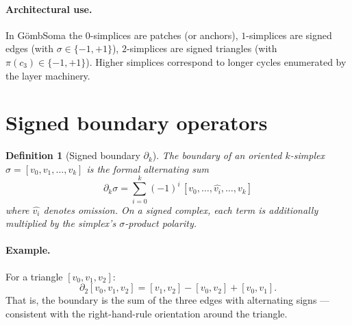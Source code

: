 \documentclass[11pt,a4paper]{article}
\newtheorem{definition}[theorem]{Definition}
\newcommand{\sig}{\ensuremath{\sigma}}
\begin{document}
\paragraph{Architectural use.} In G\"ombSoma the $0$-simplices are
patches (or anchors), $1$-simplices are signed edges (with $\sig \in
\{-1, +1\}$), $2$-simplices are signed triangles (with
$\pi(c_3) \in \{-1, +1\}$). Higher simplices correspond to longer
cycles enumerated by the layer machinery.

\section{Signed boundary operators}

\begin{definition}[Signed boundary $\partial_k$]
The boundary of an oriented $k$-simplex
$\sigma = [v_0, v_1, \ldots, v_k]$ is the formal alternating sum
\[
\partial_k \sigma = \sum_{i = 0}^{k} (-1)^i \,
   [v_0, \ldots, \hat{v_i}, \ldots, v_k]
\]
where $\hat{v_i}$ denotes omission. On a signed complex, each term
is additionally multiplied by the simplex's $\sig$-product polarity.
\end{definition}

\paragraph{Example.} For a triangle $[v_0, v_1, v_2]$:
\[
\partial_2 [v_0, v_1, v_2] = [v_1, v_2] - [v_0, v_2] + [v_0, v_1].
\]
That is, the boundary is the sum of the three edges with alternating
signs --- consistent with the right-hand-rule orientation around the
triangle.

\begin{center}
\end{center}
\end{document}
